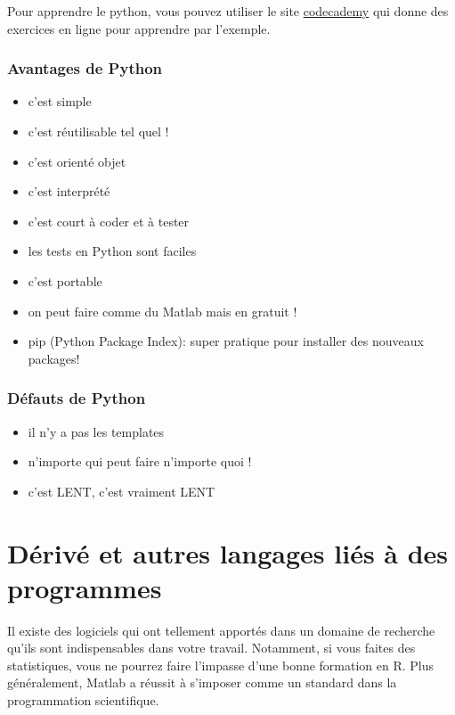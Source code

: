 Pour apprendre le python, vous pouvez utiliser le site \href{http://www.codecademy.com/tracks/python}{codecademy} 
qui donne des exercices en ligne pour apprendre par l'exemple.


\subsubsection*{Avantages de Python}
\begin{itemize}
\item c'est simple
\item c'est réutilisable tel quel ! 
\item c'est orienté objet
\item c'est interprété
\item c'est court à coder et à  tester
\item les tests en Python sont faciles %
\item c'est portable
\item on peut faire comme du Matlab mais en gratuit ! %
\item pip (Python Package Index): super pratique pour installer des nouveaux packages!
\end{itemize}

\subsubsection*{Défauts de Python}
\begin{itemize}
\item il n'y a pas les templates
\item n'importe qui peut faire n'importe quoi ! %
\item c'est LENT, c'est vraiment LENT
\end{itemize}

\section{Dérivé et autres langages liés à des programmes}

Il existe des logiciels qui ont tellement apportés dans un domaine de recherche qu'ils sont 
indispensables dans votre travail. Notamment, si vous faites des statistiques, vous ne pourrez
 faire l'impasse d'une bonne formation en R. Plus généralement, Matlab a réussit à s'imposer 
comme un standard dans la programmation scientifique.\\

